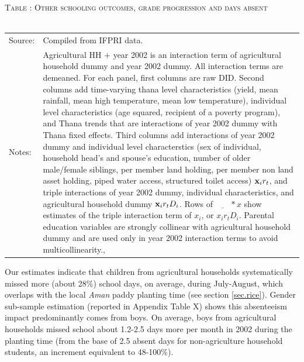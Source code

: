 \documentclass[12pt,letterpaper]{article}
\newcommand{\bfx}{\ensuremath{\mbox{\bf x}}}
\newcommand{\0}{\ensuremath{\mbox{\boldmath $0$}}}
\begin{document}
\begin{table}\hfil\textsc{\footnotesize Table \thetable: Other schooling outcomes, grade progression and days absent\label{NumGradesDaysAbsentResults}}\\\setlength{\tabcolsep}{.5pt}\renewcommand{\arraystretch}{.675}\hspace{-2em}\hfil\\\renewcommand{\arraystretch}{1}\hfil\begin{tabular}{>{\hfill\scriptsize}p{1cm}<{}>{\scriptsize}p{12cm}<{\hfill}} Source:& Compiled from IFPRI data. \\[-1ex] Notes:&   \textsf{Agricultural HH + year 2002} is an interaction term of agricultural household dummy and year 2002 dummy. All interaction terms are demeaned. For each panel, first columns are raw DID. Second columns add time-varying thana level characteristics (yield, mean rainfall, mean high temperature, mean low temperature), individual level characteristics (age squared, recipient of a poverty program), and \textsf{Thana trends} that are interactions of year 2002 dummy with Thana fixed effects. Third columns add interactions of year 2002 dummy and individual level characterstics (sex of individual, household head's and spouse's education, number of older male/female siblings, per member land holding, per member non land asset holding, piped water access, structured toilet access) $\bfx_{i}r_{t}$, and triple interactions of year 2002 dummy, individual characteristics, and agricultural household dummy $\bfx_{i}r_{t}D_{i}$. Rows of $\underline{\phantom{mm}}*x$ show estimates of the triple interaction term of $x_{i}$, or $x_{i}r_{t}D_{i}$. Parental education variables are strongly collinear with agricultural household dummy and are used only in year 2002 interaction terms to avoid multicollinearity., \\   \end{tabular} \end{table}

Our estimates indicate that children from agricultural households systematically missed more (about 28\%) school days, on average, during July-August, which overlaps with the local \textit{Aman} paddy planting time (see section \ref{sec.rice}). Gender sub-sample estimation (reported in Appendix Table X) shows this absenteeism impact predominantly comes from boys. On average, boys from agricultural households missed school about 1.2-2.5 days more per month in 2002 during the planting time (from the base of 2.5 absent days for non-agriculture household students, an increment equivalent to 48-100\%). 
\end{document}
